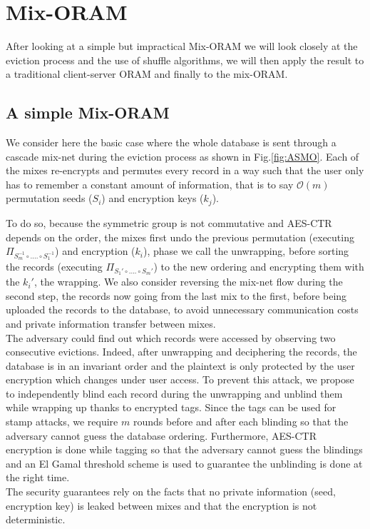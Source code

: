 \documentclass{llncs}
\begin{document}
\section{Mix-ORAM}\label{Mix-ORAM}
After looking at a simple but impractical Mix-ORAM we will look closely at the eviction process and the use of shuffle algorithms, we will then apply the result to a traditional client-server ORAM and finally to the mix-ORAM.
%
\subsection{A simple Mix-ORAM}\label{SMO}
%
We consider here the basic case where the whole database is sent through a cascade mix-net during the eviction process as shown in Fig.\ref{fig:ASMO}.
Each of the mixes re-encrypts and permutes every record in a way such that the user only has to remember a constant amount of information, that is to say $\mathcal{O}\left ( m \right )$ permutation seeds ($S_i$) and encryption keys ($k_j$).

To do so, because the symmetric group is not commutative and AES-CTR depends on the order, the mixes first undo the previous permutation (executing $\Pi_{S_m^{-1} \circ .... \circ S_1^{-1}}$) and encryption ($k_i$), phase we call the unwrapping, before sorting the records (executing $\Pi_{S_1' \circ .... \circ S_m'}$) to the new ordering and encrypting  them with the $k_i'$, the wrapping. We also consider reversing the mix-net flow during the second step, the records now going from the last mix to the first, before being uploaded the records to the database, to avoid unnecessary communication costs and private information transfer between mixes.\\
The adversary could find out which records were accessed by observing two consecutive evictions. Indeed, after unwrapping and deciphering the records, the database is in an invariant order and the plaintext is only protected by the user encryption which changes under user access. To prevent this attack, we propose to independently blind each record during the unwrapping and unblind them while wrapping up thanks to encrypted tags. Since the tags can be used for stamp attacks, we require $m$ rounds before and after each blinding so that the adversary cannot guess the database ordering. Furthermore, AES-CTR encryption is done while tagging so that the adversary cannot guess the blindings and an El Gamal threshold scheme is used to guarantee the unblinding is done at the right time.\\
The security guarantees rely on the facts that no private information (seed, encryption key) is leaked between mixes and that the encryption is not deterministic.
\end{document}
